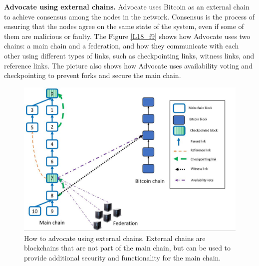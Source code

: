 \textbf{Advocate using external chains.} Advocate uses Bitcoin as an external chain to achieve consensus among the nodes in the network. Consensus is the process of ensuring that the nodes agree on the same state of the system, even if some of them are malicious or faulty. The Figure \ref{L18_f9} shows how Advocate uses two chains: a main chain and a federation, and how they communicate with each other using different types of links, such as checkpointing links, witness links, and reference links. The picture also shows how Advocate uses availability voting and checkpointing to prevent forks and secure the main chain.
\begin{figure}[h!]
	\centering
	\includegraphics[width=0.8\linewidth]{Fig/18/F9}
	\caption{How to advocate using external chains. External chains are blockchains that are not part of the main chain, but can be used to provide additional security and functionality for the main chain.}
	\label{fig:L18_f9}
\end{figure}
